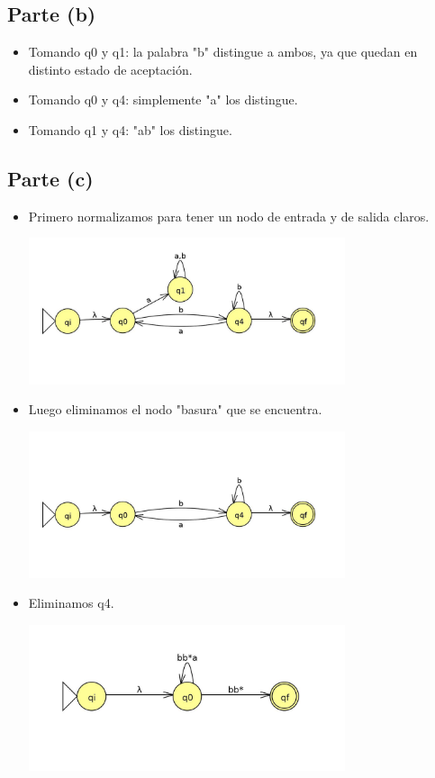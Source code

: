 \documentclass[11pt,letterpaper]{article}
\begin{document}
\subsection{Parte (b)}
\begin{itemize}
	\item{Tomando q0 y q1: la palabra "b" distingue a ambos, ya que quedan en distinto estado de aceptación.}
	\item{Tomando q0 y q4: simplemente "a" los distingue.}
	\item{Tomando q1 y q4: "ab" los distingue.}
\end{itemize}

\subsection{Parte (c)}
\begin{itemize}
\item{Primero normalizamos para tener un nodo de entrada y de salida claros.}
\begin{center}
\includegraphics[height=4.3cm]{tarea_1-c.png}
\end{center}
\item{Luego eliminamos el nodo "basura" que se encuentra.}
\begin{center}
\includegraphics[height=4.3cm]{tarea_1-c2.png}
\end{center}
\item{Eliminamos q4.}
\begin{center}
\includegraphics[height=4.3cm]{tarea_1-c3.png}

\end{center}
\end{itemize}
\end{document}
